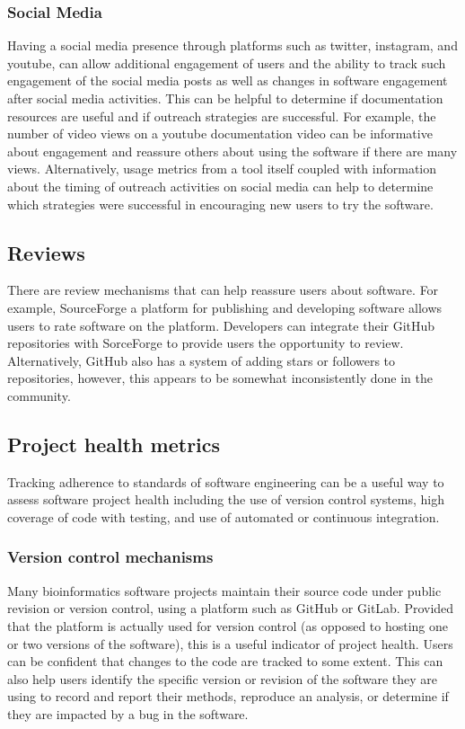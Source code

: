 \documentclass{article}
\begin{document}
\subsubsection{Social Media}
Having a social media presence through platforms such as twitter, instagram, and youtube, can allow additional engagement of users and the ability to track such engagement of the social media posts as well as changes in software engagement after social media activities. This can be helpful to determine if documentation resources are useful and if outreach strategies are successful. For example, the number of video views on a youtube documentation video can be informative about engagement and reassure others about using the software if there are many views. Alternatively, usage metrics from a tool itself coupled with information about the timing of outreach activities on social media can help to determine which strategies were successful in encouraging new users to try the software.

\subsection{Reviews}
There are review mechanisms that can help reassure users about software. For example, SourceForge\cite{sourceforge} a platform for publishing and developing software allows users to rate software on the platform. Developers can integrate their GitHub repositories with SorceForge to provide users the opportunity to review. Alternatively, GitHub also has a system of adding stars or followers to repositories, however, this appears to be somewhat inconsistently done in the community. 

\subsection{Project health metrics}
Tracking adherence to standards of software engineering can be a useful way to assess software project health including the use of version control systems, high coverage of code with testing, and use of automated or continuous integration.

\subsubsection{Version control mechanisms}
Many bioinformatics software projects maintain their source code under public revision or version control, using a platform such as GitHub or GitLab. Provided that the platform is actually used for version control (as opposed to hosting one or two versions of the software), this is a useful indicator of project health. Users can be confident that changes to the code are tracked to some extent. This can also help users identify the specific version or revision of the software they are using to record and report their methods, reproduce an analysis, or determine if they are impacted by a bug in the software. 
\end{document}
